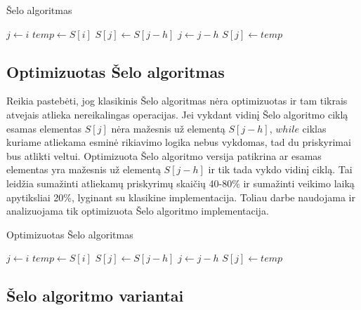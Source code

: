 \documentclass{VUMIFInfBakalaurinis}
\begin{document}
\begin{algorithm}[H]
  \caption{Šelo algoritmas}\label{alg:shellsort}
  \begin{algorithmic}[1]
      \State $j\gets i$
      \State $temp\gets S[i]$
        \State $S[j]\gets S[j - h]$
        \State $j\gets j-h$
      \EndWhile
      \State $S[j]\gets temp$
    \EndFor
  \EndFor
  \end{algorithmic}
\end{algorithm}

\subsection{Optimizuotas Šelo algoritmas}

Reikia pastebėti, jog klasikinis Šelo algoritmas nėra optimizuotas ir tam tikrais atvejais atlieka nereikalingas operacijas.
Jei vykdant vidinį Šelo algoritmo ciklą esamas elementas $S[j]$ nėra mažesnis už elementą $S[j-h]$,
$while$ ciklas kuriame atliekama esminė rikiavimo logika nebus vykdomas, tad du priskyrimai bus atlikti veltui.
Optimizuota Šelo algoritmo versija \cite{Radavičius_Baranauskas_2013} patikrina ar esamas elementas yra mažesnis už elementą $S[j-h]$ ir tik tada vykdo vidinį ciklą.
Tai leidžia sumažinti atliekamų priskyrimų skaičių 40-80\% ir sumažinti veikimo laiką apytiksliai 20\%, lyginant su klasikine implementacija.
Toliau darbe naudojama ir analizuojama tik optimizuota Šelo algoritmo implementacija. 

\begin{algorithm}[H]
    \caption{Optimizuotas Šelo algoritmas}\label{alg:shellsort_optimized}
    \begin{algorithmic}[1]
            \State $j\gets i$
            \State $temp\gets S[i]$
            \Repeat
              \State $S[j]\gets S[j - h]$
              \State $j\gets j-h$
            \State $S[j]\gets temp$
          \EndIf
        \EndFor
      \EndFor
    \end{algorithmic}
  \end{algorithm}

\subsection{Šelo algoritmo variantai}
\end{document}
